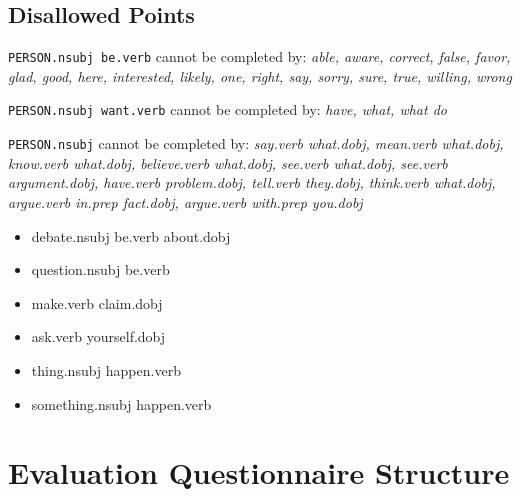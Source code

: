\begin{appendices}
      \section{Disallowed Points}
        \texttt{PERSON.nsubj be.verb} cannot be completed by: \textit{able, aware, correct, false, favor, glad, good, here, interested, likely, one, right, say, sorry, sure, true, willing, wrong}

        \noindent\texttt{PERSON.nsubj want.verb} cannot be completed by: \textit{have, what, what do}

        \noindent\texttt{PERSON.nsubj} cannot be completed by: \textit{say.verb what.dobj, mean.verb what.dobj, know.verb what.dobj, believe.verb what.dobj, see.verb what.dobj, see.verb argument.dobj, have.verb problem.dobj, tell.verb they.dobj, think.verb what.dobj, argue.verb in.prep fact.dobj, argue.verb with.prep you.dobj}

        \begin{itemize}
		  \item{debate.nsubj be.verb about.dobj}
		  \item{question.nsubj be.verb}
		  \item{make.verb claim.dobj}
		  \item{ask.verb yourself.dobj}
		  \item{thing.nsubj happen.verb}
		  \item{something.nsubj happen.verb}
        \end{itemize}

    \chapter{Evaluation Questionnaire Structure \label{app:evaluation-questionnaire-layouts}}
\end{appendices}
